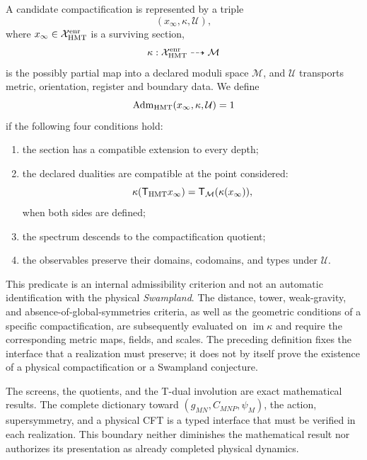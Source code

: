 \begin{definition}
\label{def:admisibilidad-compactificacion-hmt-rev3}
A candidate compactification is represented by a triple
\[
 (x_\infty,\kappa,\mathcal U),
\]
where \(x_\infty\in\mathcal X_{\rm HMT}^{\rm enr}\) is a surviving
section,
\[
 \kappa:\mathcal X_{\rm HMT}^{\rm enr}\dashrightarrow\mathcal M
\]
is the possibly partial map into a declared moduli space
\(\mathcal M\), and
\(\mathcal U\) transports metric, orientation, register and boundary data.
We define
\[
 \operatorname{Adm}_{\rm HMT}(x_\infty,\kappa,\mathcal U)=1
\]
if the following four conditions hold:
\begin{enumerate}
 \item the section has a compatible extension to every depth;
 \item the declared dualities are compatible at the point considered:
       \[
        \kappa(\mathsf T_{\rm HMT}x_\infty)
        =\mathsf T_{\mathcal M}(\kappa(x_\infty)),
       \]
       when both sides are defined;
 \item the spectrum descends to the compactification quotient;
 \item the observables preserve their domains, codomains, and types under
       \(\mathcal U\).
\end{enumerate}
\end{definition}

This predicate is an internal admissibility criterion and not an automatic identification with the physical \emph{Swampland}. The distance, tower, weak-gravity, and absence-of-global-symmetries criteria, as well as the geometric conditions of a specific compactification, are subsequently evaluated on \(\operatorname{im}\kappa\) and require the corresponding metric maps, fields, and scales. The preceding definition fixes the interface that a realization must preserve; it does not by itself prove the existence of a physical compactification or a Swampland conjecture.

\begin{statusbox}[title={Status of the interface}] The screens, the quotients, and the T-dual involution are exact mathematical results. The complete dictionary toward \((g_{MN},C_{MNP},\psi_M)\), the action, supersymmetry, and a physical CFT is a typed interface that must be verified in each realization. This boundary neither diminishes the mathematical result nor authorizes its presentation as already completed physical dynamics.
\end{statusbox}
